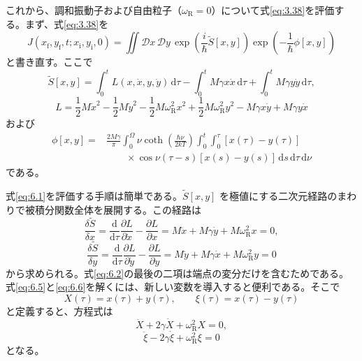 これから、調和振動子および自由粒子（$\omega_{\mathrm R}=0$）について式\eqref{eq:3.38}を評価する。まず、式\eqref{eq:3.38}を
\begin{equation}
J(x_{\mathrm f},y_{\mathrm f},t;x_{\mathrm i},y_{\mathrm i},0)
=\iint\mathcal Dx\,\mathcal Dy\,
\exp\!\left(\frac{i}{\hbar}\tilde S[x,y]\right)
\exp\!\left(-\frac1\hbar\phi[x,y]\right)
\tag{6.1}\label{eq:6.1}
\end{equation}
と書き直す。ここで
\begin{equation}
\tilde S[x,y]=\int_0^tL(x,\dot x,y,\dot y)\,\mathrm d\tau
-\int_0^tM\gamma x\dot x\,\mathrm d\tau
+\int_0^tM\gamma y\dot y\,\mathrm d\tau,
\tag{6.2}\label{eq:6.2}
\end{equation}
\begin{equation}
L=\frac12M\dot x^2-\frac12M\dot y^2
-\frac12M\omega_{\mathrm R}^2x^2+\frac12M\omega_{\mathrm R}^2y^2
-M\gamma x\dot y+M\gamma y\dot x
\tag{6.3}\label{eq:6.3}
\end{equation}
および
\begin{equation}
\begin{aligned}
\phi[x,y]={}&\frac{2M\gamma}{\pi}\int_0^\Omega
\nu\coth\!\left(\frac{\hbar\nu}{2kT}\right)
\int_0^t\int_0^\tau[x(\tau)-y(\tau)]\\
&\qquad\times\cos\nu(\tau-s)[x(s)-y(s)]\,\mathrm ds\,\mathrm d\tau\,\mathrm d\nu
\end{aligned}
\tag{6.4}\label{eq:6.4}
\end{equation}
である。

式\eqref{eq:6.1}を評価する手順は簡単である。$\tilde S[x,y]$ を極値にする二次元経路のまわりで被積分関数全体を展開する。この経路は
\begin{equation}
\frac{\delta\tilde S}{\delta x}
=\frac{\mathrm d}{\mathrm d\tau}\frac{\partial L}{\partial\dot x}
-\frac{\partial L}{\partial x}
=M\ddot x+M\gamma\dot y+M\omega_{\mathrm R}^2x=0,
\tag{6.5}\label{eq:6.5}
\end{equation}
\begin{equation}
\frac{\delta\tilde S}{\delta y}
=\frac{\mathrm d}{\mathrm d\tau}\frac{\partial L}{\partial\dot y}
-\frac{\partial L}{\partial y}
=M\ddot y+M\gamma\dot x+M\omega_{\mathrm R}^2y=0
\tag{6.6}\label{eq:6.6}
\end{equation}
から求められる。式\eqref{eq:6.2}の最後の二項は端点の変分だけを含むためである。式\eqref{eq:6.5}と\eqref{eq:6.6}を解くには、新しい変数を導入すると便利である。そこで
\begin{equation}
X(\tau)=x(\tau)+y(\tau),\qquad
\xi(\tau)=x(\tau)-y(\tau)
\tag{6.7}\label{eq:6.7}
\end{equation}
と定義すると、方程式は
\begin{equation}
\ddot X+2\gamma\dot X+\omega_{\mathrm R}^2X=0,
\tag{6.8}\label{eq:6.8}
\end{equation}
\begin{equation}
\ddot\xi-2\gamma\dot\xi+\omega_{\mathrm R}^2\xi=0
\tag{6.9}\label{eq:6.9}
\end{equation}
となる。

